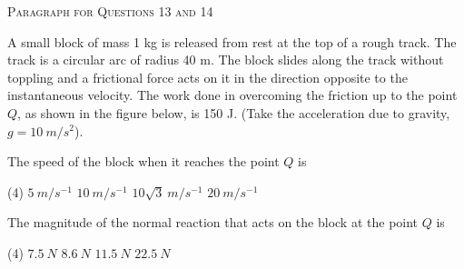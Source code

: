 \begin{center}
    \textsc{Paragraph for Questions 13 and 14}
\end{center}

A small block of mass 1 kg is released from rest at the top of a rough track. The track is a circular arc of radius 40 m. The block slides along the track without toppling and a frictional force acts on it in the direction opposite to the instantaneous velocity. The work done in overcoming the friction up to the point \( Q \), as shown in the figure below, is 150 J. (Take the acceleration due to gravity, \( g = 10\ m/s^2 \)).

\begin{center}
\end{center}

\item The speed of the block when it reaches the point \( Q \) is
    \begin{tasks}(4)
        \task \( 5\ m/s^{-1} \)
        \task \( 10\ m/s^{-1} \)
        \task \( 10\sqrt{3}\ m/s^{-1} \)
        \task \( 20\ m/s^{-1} \)
    \end{tasks}
    
\item The magnitude of the normal reaction that acts on the block at the point \( Q \) is
    \begin{tasks}(4)
        \task \( 7.5\ N \)
        \task \( 8.6\ N \)
        \task \( 11.5\ N \)
        \task \( 22.5\ N \)
    \end{tasks}